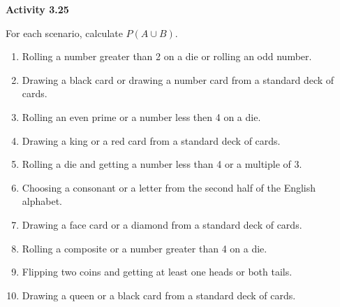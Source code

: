 \vspace{0.3ex}
\noindent\textbf{Activity 3.25}

\vspace{0.2ex}

For each scenario, calculate \( P(A \cup B) \).

\begin{enumerate}[label=\color{blue}\arabic*.]
    \item Rolling a number greater than 2 on a die or rolling an odd number.
    \item Drawing a black card or drawing a number card from a standard deck of cards.
    \item Rolling an even prime or a number less then 4 on a die.
\item Drawing a king or a red card from a standard deck of cards.

    \item Rolling a die and getting a number less than 4 or a multiple of 3.
    \item Choosing a consonant or a letter from the second half of the English alphabet.
    \item Drawing a face card or a diamond from a standard deck of cards.
    \item Rolling a composite or a number greater than 4 on a die.

    \item Flipping two coins and getting at least one heads or both tails.
    \item Drawing a queen or a black card from a standard deck of cards.
\end{enumerate}
